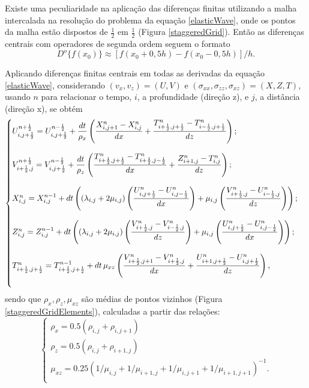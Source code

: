 \documentclass[
	12pt,				%
	openright,			%
	oneside,			%
	a4paper,			%
	english,			%
	brazil				%
	]{abntex2}
\begin{document}
	Existe uma peculiaridade na aplicação das diferenças finitas utilizando a malha intercalada na resolução do problema da equação \ref{elasticWave}, onde os pontos da malha estão dispostos de $\frac{1}{2}$ em $\frac{1}{2}$ (Figura \ref{staggeredGrid}). Então as diferenças centrais com operadores de segunda ordem seguem o formato
%
	\begin{equation}
		D^o\{f(x_0)\} \approx \left[f(x_0 + 0,5h) - f(x_0 - 0,5h)\right] / h. 
	\end{equation}
%

	\newpage
	Aplicando diferenças finitas centrais em todas as derivadas da equação \ref{elasticWave}, considerando $(v_x, v_z) = (U,V)$ e $(\sigma_{xx},\sigma_{zz},\sigma_{xz}) = (X,Z,T)$, usando $n$ para relacionar o tempo, $i$, a profundidade (direção z), e $j$, a distância (direção x), se obtém
%
	\begin{equation}
		\begin{cases}
			\bigskip	
			U^{n+\frac{1}{2}}_{i,j+\frac{1}{2}} = U^{n-\frac{1}{2}}_{i,j+\frac{1}{2}} + \dfrac{dt}{\rho_x}\left(\dfrac{X^n_{i,j+1} - X^n_{i,j}}{dx} + \dfrac{T^n_{i+\frac{1}{2},j+\frac{1}{2}} - T^n_{i-\frac{1}{2},j+\frac{1}{2}}}{dz}\right);\\	
			\bigskip
			V^{n+\frac{1}{2}}_{i+\frac{1}{2},j} = V^{n-\frac{1}{2}}_{i,j+\frac{1}{2}} + \dfrac{dt}{\rho_z}\left(\dfrac{T^n_{i+\frac{1}{2},j+\frac{1}{2}} - T^n_{i+\frac{1}{2},j-\frac{1}{2}}}{dx} + \dfrac{Z^n_{i+1,j} - T^n_{i,j}}{dz}\right);	\\
			\bigskip
			X^{n}_{i,j} = X^{n-1}_{i,j} + dt\left((\lambda_{i,j} + 2\mu_{i,j})\left( \dfrac{U^n_{i,j+\frac{1}{2}} - U^n_{i,j-\frac{1}{2}}}{dx}\right) + \mu_{i,j}\left(\dfrac{V^n_{i+\frac{1}{2},j} - U^n_{i-\frac{1}{2},j}}{dz}\right)\right);\\		
			\bigskip
			Z^{n}_{i,j} = Z^{n-1}_{i,j} + dt\left((\lambda_{i,j} + 2\mu_{i,j})\left( \dfrac{V^n_{i+\frac{1}{2},j} - V^n_{i-\frac{1}{2},j}}{dz}\right) + \mu_{i,j}\left(\dfrac{U^n_{i,j+\frac{1}{2}} - U^n_{i,j-\frac{1}{2}}}{dx}\right)\right);	\\	
			\bigskip			
			T^{n}_{i+\frac{1}{2},j+\frac{1}{2}} = T^{n-1}_{i+\frac{1}{2},j+\frac{1}{2}} + dt\,\mu_{xz}\left(\dfrac{V^n_{i+\frac{1}{2},j+1} - V^n_{i+\frac{1}{2},j}}{dx} +  \dfrac{U^n_{i+1,j+\frac{1}{2}} - U^n_{i,j+\frac{1}{2}}}{dz}\right),		\\
		\end{cases}
	\end{equation} 
%
	\noindent sendo que $\rho_x, \rho_z, \mu_{xz}$ são médias de pontos vizinhos (Figura \ref{staggeredGridElements}), calculadas a partir das relações:
%
	\begin{equation}
		\begin{cases}
			\rho_x = 0.5(\rho_{i,j} + \rho_{i,j+1}) \\
			\rho_z = 0.5(\rho_{i,j} + \rho_{i+1,j}) \\	
			\mu_{xz} = 0.25(1/\mu_{i,j} + 1/\mu_{i+1,j} + 1/\mu_{i,j+1} + 1/\mu_{i+1,j+1})^{-1}. \\		
		\end{cases}
	\end{equation}
\end{document}
